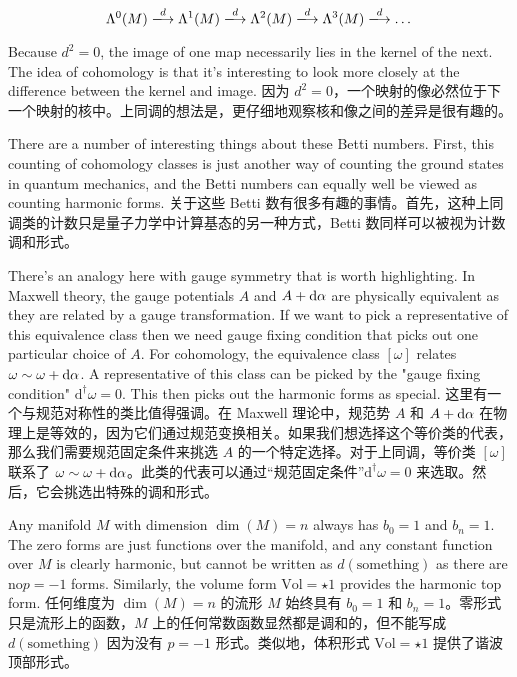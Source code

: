 \documentclass{ctexart}
\begin{document}
\[ \Lambda^0(M) \xlongrightarrow{d} \Lambda^1(M) \xlongrightarrow{d} \Lambda^2(M) \xlongrightarrow{d} \Lambda^3(M) \xlongrightarrow{d} \dots \]

\begin{paracol}{2}

Because $d^2 = 0$, the image of one map necessarily lies in the kernel of the next. The idea of cohomology is that it’s interesting to look more closely at the difference between the kernel and image.
\switchcolumn
因为 $d^2 = 0$，一个映射的像必然位于下一个映射的核中。上同调的想法是，更仔细地观察核和像之间的差异是很有趣的。
\switchcolumn*

There are a number of interesting things about these Betti numbers. First, this counting of cohomology classes is just another way of counting the ground states in quantum mechanics, and the Betti numbers can equally well be viewed as counting harmonic forms.
\switchcolumn
关于这些 Betti 数有很多有趣的事情。首先，这种上同调类的计数只是量子力学中计算基态的另一种方式，Betti 数同样可以被视为计数调和形式。
\switchcolumn*

There’s an analogy here with gauge symmetry that is worth highlighting. In Maxwell theory, the gauge potentials $A$ and $A + \odif{\alpha}$ are physically equivalent as they are related by a gauge transformation. If we want to pick a representative of this equivalence class then we need gauge fixing condition that picks out one particular choice of $A$. For cohomology, the equivalence class $[\omega]$ relates $\omega \sim \omega + \odif{\alpha}$. A representative of this class can be picked by the "gauge fixing condition" $\mathrm{d}^{\dagger} \omega = 0$. This then picks out the harmonic forms as special.
\switchcolumn
这里有一个与规范对称性的类比值得强调。在 Maxwell 理论中，规范势 $A$ 和 $A + \odif{\alpha}$ 在物理上是等效的，因为它们通过规范变换相关。如果我们想选择这个等价类的代表，那么我们需要规范固定条件来挑选 $A$ 的一个特定选择。对于上同调，等价类 $[\omega]$ 联系了 $\omega \sim \omega + \odif{\alpha}$。此类的代表可以通过“规范固定条件”$\mathrm{d}^{\dagger} \omega = 0$ 来选取。然后，它会挑选出特殊的调和形式。
\switchcolumn*

Any manifold $M$ with dimension $\dim(M) = n$ always has $b_0 = 1$ and $b_n = 1$. The zero forms are just functions over the manifold, and any constant function over $M$ is clearly harmonic, but cannot be written as $d(\text{something})$ as there are no$p = - 1$ forms. Similarly, the volume form $\text{Vol} = \star 1$ provides the harmonic top form.
\switchcolumn
任何维度为 $\dim(M) = n$ 的流形 $M$ 始终具有 $b_0 = 1$ 和 $b_n = 1$。零形式只是流形上的函数，$M$ 上的任何常数函数显然都是调和的，但不能写成 $d(\text{something})$ 因为没有 $p = - 1$ 形式。类似地，体积形式 $\text{Vol} = \star 1$ 提供了谐波顶部形式。
\switchcolumn*


\end{paracol}
\end{document}
